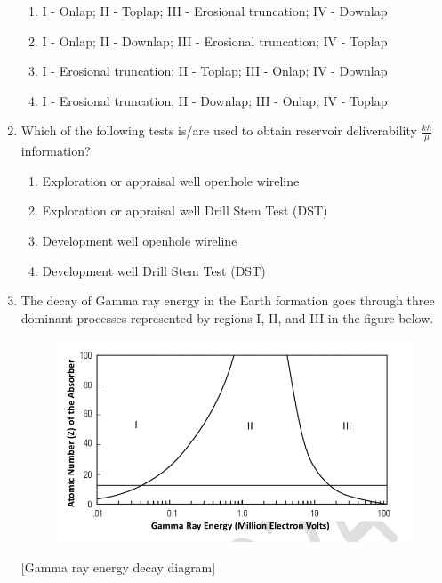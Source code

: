 \documentclass[journal,12pt,onecolumn]{IEEEtran}
\theoremstyle{remark}
\begin{document}
\begin{enumerate}
\begin{enumerate}
    \item I - Onlap; II - Toplap; III - Erosional truncation; IV - Downlap
    \item I - Onlap; II - Downlap; III - Erosional truncation; IV - Toplap
    \item I - Erosional truncation; II - Toplap; III - Onlap; IV - Downlap
    \item I - Erosional truncation; II - Downlap; III - Onlap; IV - Toplap
\end{enumerate}
\hfill{}
\item  Which of the following tests is/are used to obtain reservoir deliverability \(\frac{kh}{\mu}\) information?
\begin{enumerate}[label=\arabic*.]
    \item Exploration or appraisal well openhole wireline
    \item Exploration or appraisal well Drill Stem Test (DST)
    \item Development well openhole wireline
    \item Development well Drill Stem Test (DST)
\end{enumerate}
\begin{enumerate}
\end{enumerate}
\hfill{}
\item  The decay of Gamma ray energy in the Earth formation goes through three dominant processes represented by regions I, II, and III in the figure below.
\begin{figure}[h]
    \centering
    \includegraphics[width=0.5\columnwidth]{figs/im 11.jpeg}
    \caption{}
    \label{fig:placeholder}
\end{figure}
[Gamma ray energy decay diagram]


\end{enumerate}
\end{document}
